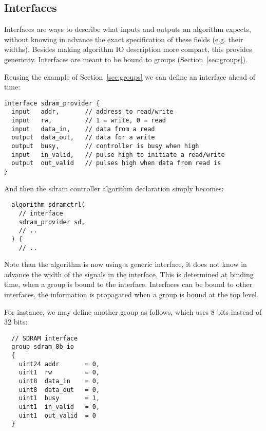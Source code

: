 \documentclass[a4]{article}
\begin{document}

\subsection{Interfaces}
\label{sec:interfaces}

Interfaces are ways to describe what inputs and outputs an algorithm expects, without knowing in advance the exact specification of these fields (e.g. their widths). Besides making algorithm IO description more compact, this provides
genericity. Interfaces are meant to be bound to groups (Section~\ref{sec:groups}).

Reusing the example of Section~\ref{sec:groups} we can define an interface ahead of time: 

\begin{verbatim}
interface sdram_provider {
  input   addr,       // address to read/write
  input   rw,         // 1 = write, 0 = read
  input   data_in,    // data from a read
  output  data_out,   // data for a write
  output  busy,       // controller is busy when high
  input   in_valid,   // pulse high to initiate a read/write
  output  out_valid   // pulses high when data from read is
}
\end{verbatim}

And then the sdram controller algorithm declaration simply becomes:

\begin{verbatim}
  algorithm sdramctrl(
    // interface
    sdram_provider sd,
    // ..
  ) {
    // ..
\end{verbatim}

Note than the algorithm is now using a generic interface, it does not know
in advance the width of the signals in the interface. This is determined
at binding time, when a group is bound to the interface. Interfaces can be bound to other interfaces, the information is propagated
when a group is bound at the top level.

For instance, we may define another group as follows, which uses 8 bits
instead of 32 bits:

\begin{verbatim}
  // SDRAM interface
  group sdram_8b_io
  {
    uint24 addr       = 0,
    uint1  rw         = 0,
    uint8  data_in    = 0,
    uint8  data_out   = 0,
    uint1  busy       = 1,
    uint1  in_valid   = 0,
    uint1  out_valid  = 0
  }
  \end{verbatim}
  
\end{document}
